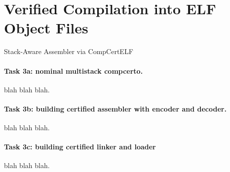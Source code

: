 \section{Verified Compilation into ELF Object Files}

Stack-Aware Assembler via CompCertELF

\paragraph*{Task 3a: nominal multistack compcerto.}
blah blah blah.

\paragraph*{Task 3b: building certified assembler with encoder and decoder.}
blah blah blah.

\paragraph*{Task 3c: building certified linker and loader}
blah blah blah.

   
   
